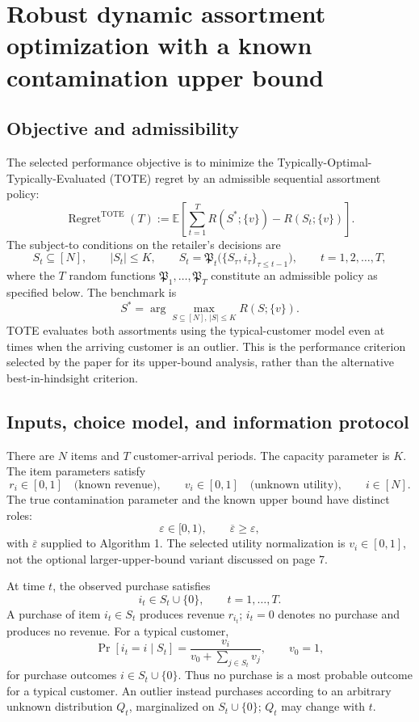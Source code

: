 \documentclass{article}
\begin{document}
\section*{Robust dynamic assortment optimization with a known contamination upper bound}

\subsection*{Objective and admissibility}
The selected performance objective is to minimize the Typically-Optimal-Typically-Evaluated (TOTE) regret by an admissible sequential assortment policy:
\begin{equation}
\operatorname{Regret}^{\mathrm{TOTE}}(T)
:=\mathbb{E}\left[\sum_{t=1}^{T} R(S^*;\{v\})-R(S_t;\{v\})\right].
\tag{2}
\end{equation}
The subject-to conditions on the retailer's decisions are
\[
S_t\subseteq[N],\qquad |S_t|\le K,\qquad
S_t=\mathfrak{P}_t\bigl(\{S_\tau,i_\tau\}_{\tau\le t-1}\bigr),
\qquad t=1,2,\ldots,T,
\]
where the $T$ random functions $\mathfrak{P}_1,\ldots,\mathfrak{P}_T$ constitute an admissible policy as specified below. The benchmark is
\[
S^*=\arg\max_{S\subseteq[N],\,|S|\le K}R(S;\{v\}).
\]
TOTE evaluates both assortments using the typical-customer model even at times when the arriving customer is an outlier. This is the performance criterion selected by the paper for its upper-bound analysis, rather than the alternative best-in-hindsight criterion.

\subsection*{Inputs, choice model, and information protocol}
There are $N$ items and $T$ customer-arrival periods. The capacity parameter is $K$. The item parameters satisfy
\[
r_i\in[0,1]\quad\text{(known revenue)},\qquad
v_i\in[0,1]\quad\text{(unknown utility)},\qquad i\in[N].
\]
The true contamination parameter and the known upper bound have distinct roles:
\[
\varepsilon\in[0,1),\qquad \overline{\varepsilon}\ge\varepsilon,
\]
with $\overline{\varepsilon}$ supplied to Algorithm 1. The selected utility normalization is $v_i\in[0,1]$, not the optional larger-upper-bound variant discussed on page 7.

At time $t$, the observed purchase satisfies
\[
i_t\in S_t\cup\{0\},\qquad t=1,\ldots,T.
\]
A purchase of item $i_t\in S_t$ produces revenue $r_{i_t}$; $i_t=0$ denotes no purchase and produces no revenue. For a typical customer,
\begin{equation}
\Pr[i_t=i\mid S_t]
=\frac{v_i}{v_0+\sum_{j\in S_t}v_j},\qquad v_0=1,
\tag{1}
\end{equation}
for purchase outcomes $i\in S_t\cup\{0\}$. Thus no purchase is a most probable outcome for a typical customer. An outlier instead purchases according to an arbitrary unknown distribution $Q_t$, marginalized on $S_t\cup\{0\}$; $Q_t$ may change with $t$.
\end{document}
